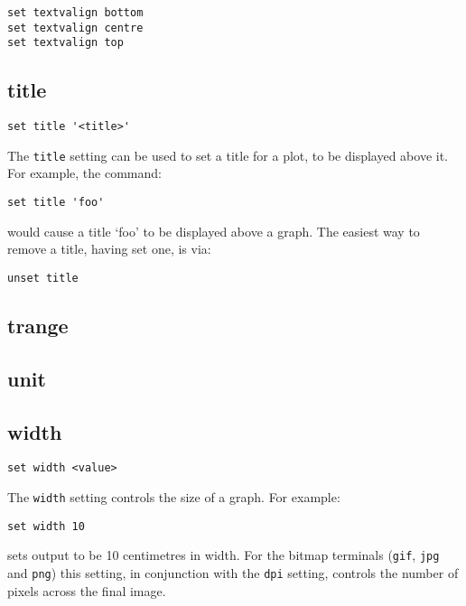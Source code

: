 \begin{verbatim}
set textvalign bottom
set textvalign centre
set textvalign top
\end{verbatim}


\subsection{title}

\begin{verbatim}
set title '<title>'
\end{verbatim}

The {\tt title} setting can be used to set a title for a plot, to be displayed
above it.  For example, the command:

\begin{verbatim}
set title 'foo'
\end{verbatim}

\noindent would cause a title `foo' to be displayed above a graph. The easiest
way to remove a title, having set one, is via:

\begin{verbatim}
unset title
\end{verbatim}


\subsection{trange}


\subsection{unit}


\subsection{width}

\begin{verbatim}
set width <value>
\end{verbatim}

The {\tt width} setting controls the size of a graph.  For example:

\begin{verbatim}
set width 10
\end{verbatim}

\noindent sets output to be 10 centimetres in width.  For the bitmap terminals ({\tt gif},
{\tt jpg} and {\tt png}) this setting, in conjunction with the {\tt dpi}
setting, controls the number of pixels across the final image.


